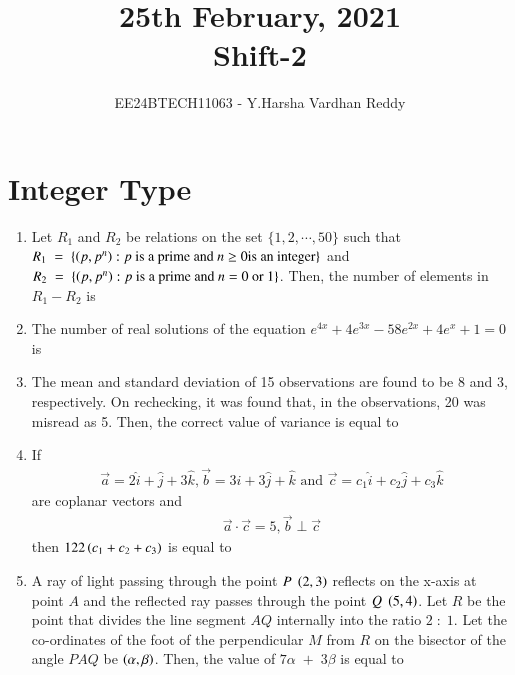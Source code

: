 \documentclass[journal,,12pt,onecolumn]{IEEEtran}
\theoremstyle{remark}
\begin{document}

\vspace{3cm}

\title{25th February, 2021\\Shift-2}
\author{EE24BTECH11063 - Y.Harsha Vardhan Reddy}
\maketitle

\bigskip

\renewcommand{\thefigure}{\theenumi}
\renewcommand{\thetable}{\theenumi}


\section*{Integer Type}
\begin{enumerate}
 \item Let $R_1$ and $R_2$ be relations on the set $\{1,2,\cdots , 50\}$ such that $R_1\;=\;\{\left(p,p^n\right):p\text{ is a prime and }n\ge 0 \text{is an integer}\}$ and $R_2\;=\;\{\left(p,p^n\right):p\text{ is a prime and }n=0 \text{ or } 1\}$. Then, the number of elements in $R_1-R_2$ is
 \bigskip
 \item The number of real solutions of the equation $e^{4x}+4e^{3x}-58e^{2x}+4e^{x}+1=0$ is
 \bigskip
 \item The mean and standard deviation of 15 observations are found to be 8 and 3, respectively. On rechecking, it was found that, in the observations, 20 was misread as 5. Then, the correct value of variance is equal to
 \bigskip
 \item If
 \begin{align*}
 \overset{\rightarrow}{a}=2\hat{i}+\hat{j}+3\hat{k},\overset{\rightarrow}{b}=3\hat{i}+3\hat{j}+\hat{k}\text{ and }\overset{\rightarrow}{c}=c_1\hat{i}+c_2\hat{j}+c_3\hat{k}
 \end{align*}
 are coplanar vectors and 
 \begin{align*}
 \overset{\rightarrow}{a} \cdot \overset{\rightarrow}{c}=5, \overset{\rightarrow}{b}\perp \overset{\rightarrow}{c}
 \end{align*}
 then $122\left(c_1+c_2+c_3\right)$ is equal to
 \bigskip
 \item A ray of light passing through the point $P \; \left(2,3\right)$ reflects on the x-axis at point $A$ and the reflected ray passes through the point $Q\;\left(5,4\right)$. Let $R$ be the point that divides the line segment $AQ$ internally into the ratio $2\;:\;1$. Let the co-ordinates of the foot of the perpendicular $M$ from $R$ on the bisector of the angle $PAQ$ be $\left(\alpha,\beta\right)$. Then, the value of $7\alpha\;+\;3\beta$ is equal to

\end{enumerate}
\end{document}
